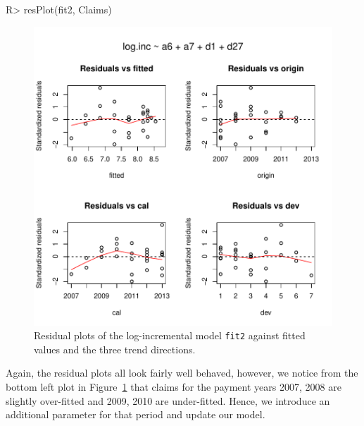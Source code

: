 \documentclass{article}
\begin{document}
\begin{Schunk}
\begin{Sinput}
R> resPlot(fit2, Claims)
\end{Sinput}
\end{Schunk}
\begin{figure}[thb]
\begin{center}
\includegraphics{Log-incremental-028}
\caption{Residual plots of the log-incremental model \texttt{fit2} against 
fitted values and the three trend directions.}\label{fig:fit2plot}
\end{center}
\end{figure}
Again, the residual plots all look fairly well behaved, 
however, we notice from the bottom left plot in Figure~\ref{fig:fit2plot} 
that claims for the payment years 2007, 2008 are slightly over-fitted and 
2009, 2010 are under-fitted. Hence, we introduce an additional parameter 
for that period and update our model.
\end{document}
